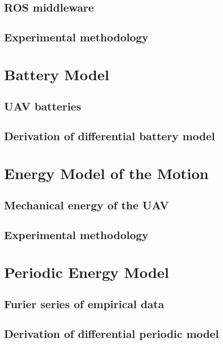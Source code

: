 \subsection{ROS middleware}

\subsection{Experimental methodology}


\section{Battery Model}

\subsection{UAV batteries}

\subsection{Derivation of differential battery model}


\section{Energy Model of the Motion}

\subsection{Mechanical energy of the UAV}

\subsection{Experimental methodology}


\section{Periodic Energy Model}

\subsection{Furier series of empirical data}

\subsection{Derivation of differential periodic model}
\label{cp:model:periodic:diff-model}

